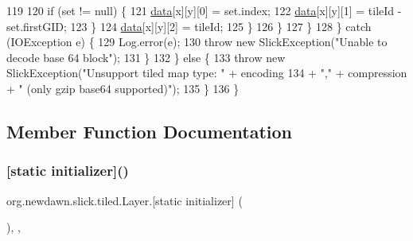 \begin{DoxyCode}
119 
120                             \textcolor{keywordflow}{if} (\textcolor{keyword}{set} != null) \{
121                                 \mbox{\hyperlink{classorg_1_1newdawn_1_1slick_1_1tiled_1_1_layer_a9370f031c215f22f2b18135d8ca5cbc8}{data}}[x][y][0] = \textcolor{keyword}{set}.index;
122                                 \mbox{\hyperlink{classorg_1_1newdawn_1_1slick_1_1tiled_1_1_layer_a9370f031c215f22f2b18135d8ca5cbc8}{data}}[x][y][1] = tileId - \textcolor{keyword}{set}.firstGID;
123                             \}
124                             \mbox{\hyperlink{classorg_1_1newdawn_1_1slick_1_1tiled_1_1_layer_a9370f031c215f22f2b18135d8ca5cbc8}{data}}[x][y][2] = tileId;
125                         \}
126                     \}
127                 \}
128             \} \textcolor{keywordflow}{catch} (IOException e) \{
129                 Log.error(e);
130                 \textcolor{keywordflow}{throw} \textcolor{keyword}{new} SlickException(\textcolor{stringliteral}{"Unable to decode base 64 block"});
131             \}
132         \} \textcolor{keywordflow}{else} \{
133             \textcolor{keywordflow}{throw} \textcolor{keyword}{new} SlickException(\textcolor{stringliteral}{"Unsupport tiled map type: "} + encoding
134                     + \textcolor{stringliteral}{","} + compression + \textcolor{stringliteral}{" (only gzip base64 supported)"});
135         \}
136     \}
\end{DoxyCode}


\subsection{Member Function Documentation}
\mbox{\label{classorg_1_1newdawn_1_1slick_1_1tiled_1_1_layer_a9b36eb42cf8972b2fce1cef60c4e3283}} 
\subsubsection{\texorpdfstring{[static initializer]()}{[static initializer]()}}
{\footnotesize\ttfamily org.\+newdawn.\+slick.\+tiled.\+Layer.\mbox{[}static initializer\mbox{]} (\begin{DoxyParamCaption}{ }\end{DoxyParamCaption})\hspace{0.3cm}{\ttfamily [inline]}, {\ttfamily [static]}, {\ttfamily [package]}}

